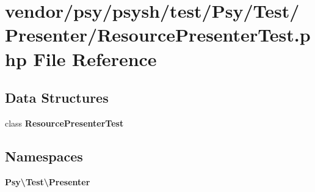 \section{vendor/psy/psysh/test/\+Psy/\+Test/\+Presenter/\+Resource\+Presenter\+Test.php File Reference}
\label{_resource_presenter_test_8php}
\subsection*{Data Structures}
\begin{DoxyCompactItemize}
\item 
class {\bf Resource\+Presenter\+Test}
\end{DoxyCompactItemize}
\subsection*{Namespaces}
\begin{DoxyCompactItemize}
\item 
 {\bf Psy\textbackslash{}\+Test\textbackslash{}\+Presenter}
\end{DoxyCompactItemize}
